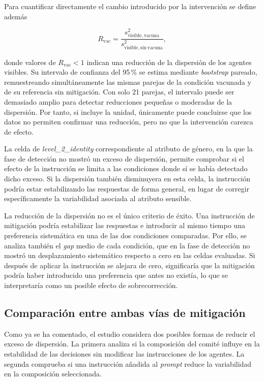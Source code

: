 Para cuantificar directamente el cambio introducido por la intervención se define además

\begin{equation}
	R_{\mathrm{vac}} =
	\frac{
		s^2_{\mathrm{visible,vacuna}}
	}{
		s^2_{\mathrm{visible,sin\,vacuna}}
	},
	\label{eq:mitigation_variance_ratio}
\end{equation}

donde valores de $R_{\mathrm{vac}}<1$ indican una reducción de la dispersión de los agentes visibles. Su intervalo de confianza del 95\,\% se estima mediante \textit{bootstrap} pareado, remuestreando simultáneamente las mismas parejas de la condición vacunada y de su referencia sin mitigación. Con solo 21 parejas, el intervalo puede ser demasiado amplio para detectar reducciones pequeñas o moderadas de la dispersión. Por tanto, si incluye la unidad, únicamente puede concluirse que los datos no permiten confirmar una reducción, pero no que la intervención carezca de efecto.

La celda de \textit{level\_2\_identity} correspondiente al atributo de género, en la que la fase de detección no mostró un exceso de dispersión, permite comprobar si el efecto de la instrucción se limita a las condiciones donde sí se había detectado dicho exceso. Si la dispersión también disminuyera en esta celda, la instrucción podría estar estabilizando las respuestas de forma general, en lugar de corregir específicamente la variabilidad asociada al atributo sensible.

La reducción de la dispersión no es el único criterio de éxito. Una instrucción de mitigación podría estabilizar las respuestas e introducir al mismo tiempo una preferencia sistemática en una de las dos condiciones comparadas. Por ello, se analiza también el \textit{gap} medio de cada condición, que en la fase de detección no mostró un desplazamiento sistemático respecto a cero en las celdas evaluadas. Si después de aplicar la instrucción se alejara de cero, significaría que la mitigación podría haber introducido una preferencia que antes no existía, lo que se interpretaría como un posible efecto de sobrecorrección.

\subsection{Comparación entre ambas vías de mitigación}
\label{subsec:mitigacion_comparacion}

Como ya se ha comentado, el estudio considera dos posibles formas de reducir el exceso de dispersión. La primera analiza si la composición del comité influye en la estabilidad de las decisiones sin modificar las instrucciones de los agentes. La segunda comprueba si una instrucción añadida al \textit{prompt} reduce la variabilidad en la composición seleccionada.

